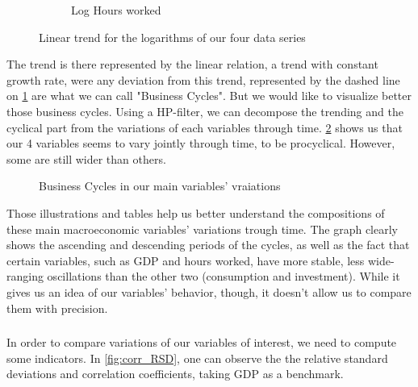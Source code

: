 \documentclass[12pt]{article}
\begin{document}
\begin{figure}
\begin{subfigure}[b]{0.45\textwidth}
      \caption{Log Hours worked}
    \end{subfigure}
    \caption{Linear trend for the logarithms of our four data series}
    \label{fig:logtrends}
\end{figure}

The trend is there represented by the linear relation, a trend with constant growth rate, were any deviation from this trend, represented by the dashed line on \ref{fig:logtrends} are what we can call "Business Cycles".
But we would like to visualize better those business cycles. Using a HP-filter, we can decompose the trending and the cyclical part from the variations of each variables through time. \ref{fig:cycles} shows us that our 4 variables seems to vary jointly through time, to be procyclical. However, some are still wider than others. 

\begin{figure}[h]
    \centering
    \caption{Business Cycles in our main variables' vraiations}
    \label{fig:cycles}
\end{figure}

Those illustrations and tables help us better understand the compositions of these main macroeconomic variables' variations trough time. 
The graph clearly shows the ascending and descending periods of the cycles, as well as the fact that certain variables, such as GDP and hours worked, have more stable, less wide-ranging oscillations than the other two (consumption and investment).
While it gives us an idea of our variables' behavior, though, it doesn't allow us to compare them with precision. 

\subsubsection*{}
In order to compare variations of our variables of interest, we need to compute some indicators. 
In \ref{fig:corr_RSD}, one can observe the the relative standard deviations and correlation coefficients, taking GDP as a benchmark.
\end{document}
